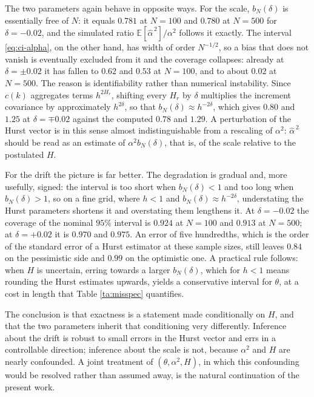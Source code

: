 \documentclass[11pt,reqno]{amsart}
\numberwithin{equation}{section}
\theoremstyle{plain}
\theoremstyle{definition}
\theoremstyle{remark}
\newcommand{\E}{\mathbb{E}}
\begin{document}
The two parameters again behave in opposite ways. For the scale, $b_N(\delta)$ is
essentially free of $N$: it equals $0.781$ at $N=100$ and $0.780$ at $N=500$ for
$\delta=-0.02$, and the simulated ratio $\E[\widehat\alpha^{\,2}]/\alpha^{2}$ follows it
exactly. The interval \eqref{eq:ci-alpha}, on the other hand, has width of order
$N^{-1/2}$, so a bias that does not vanish is eventually excluded from it and the
coverage collapses: already at $\delta=\pm0.02$ it has fallen to $0.62$ and $0.53$ at
$N=100$, and to about $0.02$ at $N=500$. The reason is identifiability rather than
numerical instability. Since $c(k)$ aggregates terms $h^{2H_r}$, shifting every $H_r$ by
$\delta$ multiplies the increment covariance by approximately $h^{2\delta}$, so that
$b_N(\delta)\approx h^{-2\delta}$, which gives $0.80$ and $1.25$ at $\delta=\mp0.02$
against the computed $0.78$ and $1.29$. A perturbation of the Hurst vector is in this
sense almost indistinguishable from a rescaling of $\alpha^{2}$: $\widehat\alpha^{\,2}$ should be read as an estimate of
$\alpha^{2}b_N(\delta)$, that is, of the scale relative to the postulated $H$.

For the drift the picture is far better. The degradation is gradual and, more usefully,
signed: the interval is too short when $b_N(\delta)<1$ and too long when
$b_N(\delta)>1$, so on a fine grid, where $h<1$ and $b_N(\delta)\approx h^{-2\delta}$,
understating the Hurst parameters shortens it and overstating them lengthens it. At
$\delta=-0.02$ the coverage of the nominal $95\%$ interval is $0.924$ at $N=100$ and
$0.913$ at $N=500$; at $\delta=+0.02$ it is $0.970$ and $0.975$. An error of five
hundredths, which is the order of the standard error of a Hurst estimator at these sample
sizes, still leaves $0.84$ on the pessimistic side and $0.99$ on the optimistic one. A
practical rule follows: when $H$ is uncertain, erring towards a larger $b_N(\delta)$,
which for $h<1$ means rounding the Hurst estimates upwards, yields a conservative
interval for $\theta$, at a cost in length that Table \ref{ta:misspec} quantifies.

The conclusion is that exactness is a statement made conditionally on $H$, and that the
two parameters inherit that conditioning very differently. Inference about the drift is
robust to small errors in the Hurst vector and errs in a controllable direction;
inference about the scale is not, because $\alpha^{2}$ and $H$ are nearly confounded. A
joint treatment of $(\theta,\alpha^{2},H)$, in which this confounding would be resolved
rather than assumed away, is the natural continuation of the present work.
\end{document}
